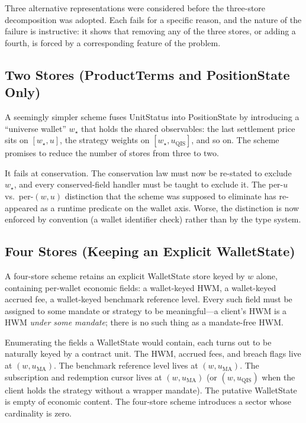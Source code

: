 \documentclass[11pt,a4paper]{article}
\begin{document}
Three alternative representations were considered before the three-store decomposition was adopted. Each fails for a specific reason, and the nature of the failure is instructive: it shows that removing any of the three stores, or adding a fourth, is forced by a corresponding feature of the problem.

\subsection{Two Stores (ProductTerms and PositionState Only)}

A seemingly simpler scheme fuses UnitStatus into PositionState by introducing a ``universe wallet'' $w_\star$ that holds the shared observables: the last settlement price sits on $[w_\star, u]$, the strategy weights on $[w_\star, u_{\mathrm{QIS}}]$, and so on. The scheme promises to reduce the number of stores from three to two.

It fails at conservation. The conservation law must now be re-stated to exclude $w_\star$, and every conserved-field handler must be taught to exclude it. The per-$u$ vs.\ per-$(w, u)$ distinction that the scheme was supposed to eliminate has re-appeared as a runtime predicate on the wallet axis. Worse, the distinction is now enforced by convention (a wallet identifier check) rather than by the type system.

\subsection{Four Stores (Keeping an Explicit WalletState)}

A four-store scheme retains an explicit WalletState store keyed by $w$ alone, containing per-wallet economic fields: a wallet-keyed HWM, a wallet-keyed accrued fee, a wallet-keyed benchmark reference level. Every such field must be assigned to some mandate or strategy to be meaningful---a client's HWM is a HWM \emph{under some mandate}; there is no such thing as a mandate-free HWM.

Enumerating the fields a WalletState would contain, each turns out to be naturally keyed by a contract unit. The HWM, accrued fees, and breach flags live at $(w, u_{\mathrm{MA}})$. The benchmark reference level lives at $(w, u_{\mathrm{MA}})$. The subscription and redemption cursor lives at $(w, u_{\mathrm{MA}})$ (or $(w, u_{\mathrm{QIS}})$ when the client holds the strategy without a wrapper mandate). The putative WalletState is empty of economic content. The four-store scheme introduces a sector whose cardinality is zero.
\end{document}
